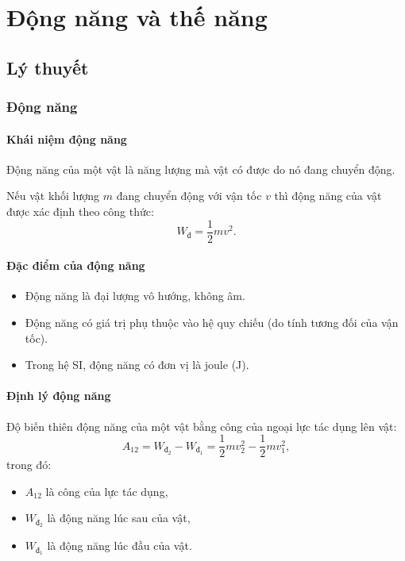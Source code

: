 \let\lesson\undefined
\newcommand{\lesson}{\phantomlesson{Bài 17: Động năng và thế năng. Định luật bảo toàn cơ năng.}}
\chapter[Động năng và thế năng]{Động năng và thế năng}
\setcounter{section}{0}
\section{Lý thuyết}
\subsection{Động năng}
\subsubsection{Khái niệm động năng}
Động năng của một vật là năng lượng mà vật có được do nó đang chuyển động. 

Nếu vật khối lượng $m$ đang chuyển động với vận tốc $v$ thì động năng của vật được xác định theo công thức:
\begin{equation*}
	W_{\text{đ}} =\dfrac{1}{2}mv^2.
\end{equation*}
\subsubsection{Đặc điểm của động năng}
\begin{itemize}
	\item Động năng là đại lượng vô hướng, không âm.
	\item Động năng có giá trị phụ thuộc vào hệ quy chiếu (do tính tương đối của vận tốc).
	\item Trong hệ SI, động năng có đơn vị là joule (J). 
\end{itemize}
\subsubsection{Định lý động năng}
Độ biến thiên động năng của một vật bằng công của ngoại lực tác dụng lên vật:
\begin{equation*}
	A_{12} = W_{\text{đ}_2}-W_{\text{đ}_1}= \dfrac{1}{2}mv^2_2-\dfrac{1}{2}mv^2_1,
\end{equation*}
trong đó:
\begin{itemize}
	\item $A_{12}$ là công của lực tác dụng,
	\item $W_{\text{đ}_2}$ là động năng lúc sau của vật,
	\item $W_{\text{đ}_1}$ là động năng lúc đầu của vật.
\end{itemize} 

